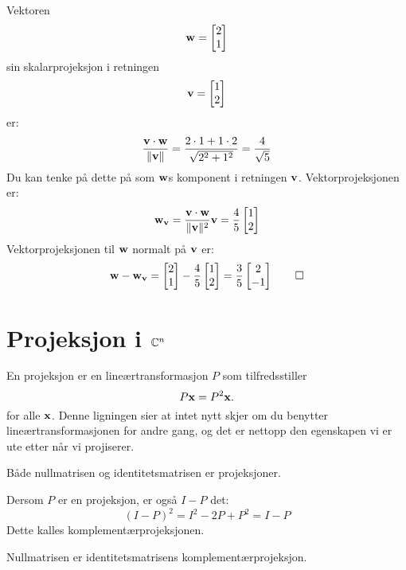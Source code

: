 \begin{ex}
Vektoren
\[
\mathbf{w}
=
\begin{bmatrix}
2 \\ 1
\end{bmatrix}
\]
sin skalarprojeksjon i retningen
\[
\mathbf{v}
=
\begin{bmatrix}
1 \\ 2
\end{bmatrix}
\]
er:
\[
\frac{\mathbf{v} \cdot \mathbf{w}}{\|\mathbf{v}\|}=\frac{2 \cdot 1+1\cdot 2}{\sqrt{2^2+1^2}}=\frac{4}{\sqrt{5}}
\]
Du kan tenke på dette på som $\mathbf{w}$s komponent i retningen $\mathbf{v}$. Vektorprojeksjonen er:
\[
\mathbf{w}_{\mathbf{v}}=\frac{\mathbf{v} \cdot \mathbf{w}}{\|\mathbf{v}\|^2}\mathbf{v}=
\frac{4}{5}
\begin{bmatrix}
1 \\ 2
\end{bmatrix} 
\]
Vektorprojeksjonen til $\mathbf{w}$ normalt på $\mathbf{v}$ er:
\[
\mathbf{w} - \mathbf{w}_{\mathbf{v}}=
\begin{bmatrix}
2 \\ 1
\end{bmatrix} 
-
\frac{4}{5}
\begin{bmatrix}
1 \\ 2
\end{bmatrix}
=
\frac{3}{5}
\begin{bmatrix}
2 \\ -1
\end{bmatrix} \qedhere
\]
\end{ex}
 



 \section*{Projeksjon i $\mathbb{C}^n$}
En projeksjon er en lineærtransformasjon $P$ som tilfredsstiller
\[
 P\mathbf{x}=P^2\mathbf{x}.
 \]
 for alle $\mathbf{x}$. Denne ligningen sier at intet nytt skjer om du benytter lineærtransformasjonen for andre gang, 
 og det er nettopp den egenskapen vi er ute etter når vi projiserer. 
 
 \begin{ex}
Både nullmatrisen og identitetsmatrisen er projeksjoner.
 \end{ex}
 
\noindent Dersom $P$ er en projeksjon, er også $I-P$ det:
\[
 (I-P)^2=I^2-2P+P^2=I-P
 \]
Dette kalles komplementærprojeksjonen.
 
\begin{ex}
Nullmatrisen er identitetsmatrisens  komplementærprojeksjon.
\end{ex}
 
